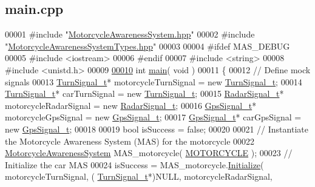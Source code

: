 \hypertarget{main_8cpp_source}{\subsection{main.\-cpp}
}

\begin{DoxyCode}
00001 \textcolor{preprocessor}{#include "\hyperlink{MotorcycleAwarenessSystem_8hpp}{MotorcycleAwarenessSystem.hpp}"}
00002 \textcolor{preprocessor}{#include "\hyperlink{MotorcycleAwarenessSystemTypes_8hpp}{MotorcycleAwarenessSystemTypes.hpp}"}
00003 
00004 \textcolor{preprocessor}{#ifdef MAS\_DEBUG}
00005 \textcolor{preprocessor}{}\textcolor{preprocessor}{#include <iostream>}
00006 \textcolor{preprocessor}{#endif}
00007 \textcolor{preprocessor}{}\textcolor{preprocessor}{#include <string>}
00008 \textcolor{preprocessor}{#include <unistd.h>}
00009 
\hypertarget{main_8cpp_source_l00010}{}\hyperlink{main_8cpp_a840291bc02cba5474a4cb46a9b9566fe}{00010} \textcolor{keywordtype}{int} \hyperlink{main_8cpp_a840291bc02cba5474a4cb46a9b9566fe}{main}( \textcolor{keywordtype}{void} )
00011 \{
00012     \textcolor{comment}{// Define mock signals}
00013     \hyperlink{structTurnSignal__t}{TurnSignal\_t}* motorcycleTurnSignal = \textcolor{keyword}{new} \hyperlink{structTurnSignal__t}{TurnSignal\_t};
00014     \hyperlink{structTurnSignal__t}{TurnSignal\_t}* carTurnSignal = \textcolor{keyword}{new} \hyperlink{structTurnSignal__t}{TurnSignal\_t};
00015     \hyperlink{structRadarSignal__t}{RadarSignal\_t}* motorcycleRadarSignal = \textcolor{keyword}{new} \hyperlink{structRadarSignal__t}{RadarSignal\_t};
00016     \hyperlink{structGpsSignal__t}{GpsSignal\_t}* motorcycleGpsSignal = \textcolor{keyword}{new} \hyperlink{structGpsSignal__t}{GpsSignal\_t};
00017     \hyperlink{structGpsSignal__t}{GpsSignal\_t}* carGpsSignal = \textcolor{keyword}{new} \hyperlink{structGpsSignal__t}{GpsSignal\_t};
00018 
00019     \textcolor{keywordtype}{bool} isSuccess = \textcolor{keyword}{false};
00020 
00021     \textcolor{comment}{// Instantiate the Motorcycle Awareness System (MAS) for the motorcycle}
00022     \hyperlink{classMotorcycleAwarenessSystem}{MotorcycleAwarenessSystem} MAS\_motorcycle( 
      \hyperlink{MotorcycleAwarenessSystemTypes_8hpp_a0c05c42b98a847f971385c81c2a81afaa39b983b1f7acfc4e7c900d77b0fded6a}{MOTORCYCLE} );
00023     \textcolor{comment}{// Initialize the car MAS}
00024     isSuccess = MAS\_motorcycle.\hyperlink{classMotorcycleAwarenessSystem_a341f27867c8d6aa0865040279ee246a9}{Initialize}( motorcycleTurnSignal, (
      \hyperlink{structTurnSignal__t}{TurnSignal\_t}*)NULL, motorcycleRadarSignal,

\end{DoxyCode}
